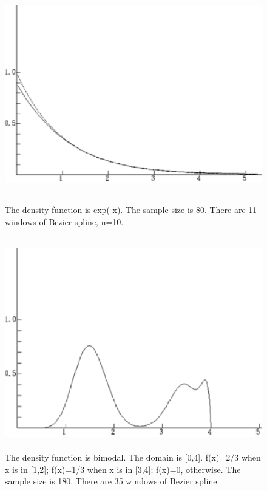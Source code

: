 \documentclass [18pt]{article}
\begin{document}
\begin{figure}[htbp]
\centerline{\includegraphics[width=5.20in,height=3.67in]{081.eps}}
\caption{The density function is exp(-x). The sample size is 80.
There are 11 windows of Bezier spline, n=10. }\label{fig1}
\end{figure}
\begin{figure}[htbp]
\centerline{\includegraphics[width=4.92in,height=3.65in]{082.eps}}
\caption{The density function is bimodal. The domain is  [0,4].
f(x)=2/3 when x is in [1,2]; f(x)=1/3 when x is in [3,4]; f(x)=0,
otherwise. The sample size is 180. There are 35 windows of Bezier
spline. } \label{fig2}
\end{figure}
\end{document}

